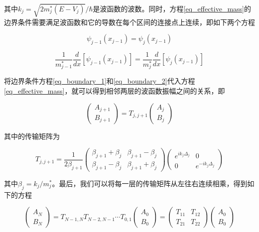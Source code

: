 \documentclass[oneside]{ZJUthesis}
\begin{document}
其中$k_j=\sqrt{2 m^*_j (E-V_j)} / \hbar$是波函数的波数。同时，方程\ref{eq_effective_mass}的边界条件需要满足波函数和它的导数在每个区间的连接点上连续，即如下两个方程

\begin{equation}
    \label{eq_boundary_1}
    \psi_{j-1}(x_{j-1}) = \psi_j(x_{j-1}) 
\end{equation}

\begin{equation}
    \label{eq_boundary_2}
    \frac{1}{m^*_{j-1}} \frac{d}{dx} [ \psi_{j-1}(x_{j-1}) ] = \frac{1}{m^*_j} \frac{d}{dx} [\psi_j(x_{j-1})]
\end{equation}

将边界条件方程\ref{eq_boundary_1}和\ref{eq_boundary_2}代入方程\ref{eq_effective_mass}，就可以得到相邻两层的波函数振幅之间的关系，即

\begin{equation}
    \label{eq_tmm}
    \begin{pmatrix} A_{j+1} \\ B_{j+1} \end{pmatrix} = T_{j,j+1} \begin{pmatrix} A_{j} \\ B_{j} \end{pmatrix}
\end{equation}

其中的传输矩阵为

\begin{equation}
    \label{eq_transfer_matrix}
    T_{j,j+1} = \frac{1}{2\beta_{j+1}} \begin{pmatrix} \beta_{j+1}+\beta_j & \beta_{j+1}-\beta_j  \\ \beta_{j+1}-\beta_j  & \beta_{j+1}+\beta_j  \end{pmatrix} \begin{pmatrix} e^{ik_j\Delta_j} & 0 \\ 0 & e^{-ik_j\Delta_j} \end{pmatrix}
\end{equation}

其中$\beta_j = k_j/m^*_j$。最后，我们可以将每一层的传输矩阵从左往右连续相乘，得到如下的方程

\begin{equation}
    \label{eq_tmm_serial}
    \begin{pmatrix} A_{N} \\ B_{N} \end{pmatrix} = T_{N-1,N}T_{N-2,N-1}\cdots T_{0,1} \begin{pmatrix} A_{0} \\ B_{0} \end{pmatrix} =  \begin{pmatrix} T_{11} & T_{12} \\ T_{21} & T_{22} \end{pmatrix} \begin{pmatrix} A_{0} \\ B_{0} \end{pmatrix}
\end{equation}
\end{document}
